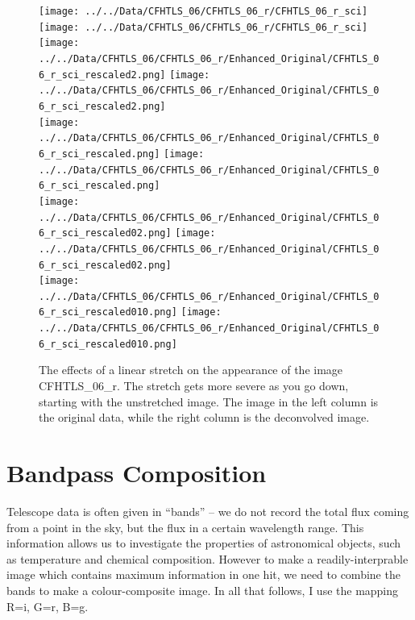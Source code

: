 \documentclass[letterpaper, 11pt]{article}
\begin{document}
\begin{figure}
	\centering
	\def\width{0.23}
	\texttt{[image: ../../Data/CFHTLS\_06/CFHTLS\_06\_r/CFHTLS\_06\_r\_sci]}	
	\texttt{[image: ../../Data/CFHTLS\_06/CFHTLS\_06\_r/CFHTLS\_06\_r\_sci]}\\\vspace{1mm}
	\texttt{[image: ../../Data/CFHTLS\_06/CFHTLS\_06\_r/Enhanced\_Original/CFHTLS\_06\_r\_sci\_rescaled2.png]}
	\texttt{[image: ../../Data/CFHTLS\_06/CFHTLS\_06\_r/Enhanced\_Original/CFHTLS\_06\_r\_sci\_rescaled2.png]}\\\vspace{1mm}
	\texttt{[image: ../../Data/CFHTLS\_06/CFHTLS\_06\_r/Enhanced\_Original/CFHTLS\_06\_r\_sci\_rescaled.png]}
	\texttt{[image: ../../Data/CFHTLS\_06/CFHTLS\_06\_r/Enhanced\_Original/CFHTLS\_06\_r\_sci\_rescaled.png]}\\\vspace{1mm}
	\texttt{[image: ../../Data/CFHTLS\_06/CFHTLS\_06\_r/Enhanced\_Original/CFHTLS\_06\_r\_sci\_rescaled02.png]}
	\texttt{[image: ../../Data/CFHTLS\_06/CFHTLS\_06\_r/Enhanced\_Original/CFHTLS\_06\_r\_sci\_rescaled02.png]}\\\vspace{1mm}
	\texttt{[image: ../../Data/CFHTLS\_06/CFHTLS\_06\_r/Enhanced\_Original/CFHTLS\_06\_r\_sci\_rescaled010.png]}
	\texttt{[image: ../../Data/CFHTLS\_06/CFHTLS\_06\_r/Enhanced\_Original/CFHTLS\_06\_r\_sci\_rescaled010.png]}\\\vspace{1mm}
	\caption{The effects of a linear stretch on the appearance of the image CFHTLS\_06\_r. The stretch gets more severe as you go down, starting with the unstretched image. The image in the left column is the original data, while the right column is the deconvolved image.}
	\label{fig:deconvolution_noise}
\end{figure}



\newpage
\section{Bandpass Composition}
\label{sec:colour}

Telescope data is often given in ``bands'' -- we do not record the total flux coming from a point in the sky, but the flux in a certain wavelength range. This information allows us to investigate the properties of astronomical objects, such as temperature and chemical composition. However to make a readily-interprable image which contains maximum information in one hit, we need to combine the bands to make a colour-composite image. In all that follows, I use the mapping R=i, G=r, B=g.
\end{document}
